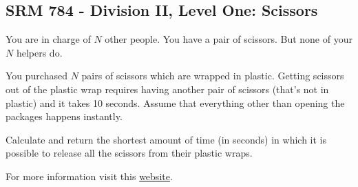 \documentclass{book}
\begin{document}
	\subsection{SRM 784 - Division II, Level One: Scissors}
	You are in charge of $N$ other people. You have a pair of scissors. But none of your $N$ helpers do. 
	\par You purchased $N$ pairs of scissors which are wrapped in plastic. Getting scissors out of the plastic wrap requires having another pair of scissors (that's not in plastic) and it takes 10 seconds. Assume that everything other than opening the packages happens instantly.
	\par Calculate and return the shortest amount of time (in seconds) in which it is possible to release all the scissors from their plastic wraps.
	\par For more information visit this \href{https://community.topcoder.com/stat?c=problem_statement&pm=16110}{website}.
\end{document}
